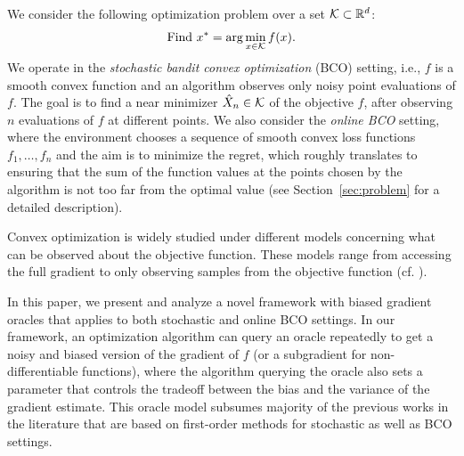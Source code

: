 We consider the following optimization problem over a set $\mathcal{K} \subset \mathbb{R}^d$:
\begin{align}
\mbox{Find } x^* = \arg\min_{x \in \mathcal{K}} f(x). \label{eq:pb}
\end{align}
We operate in the \textit{stochastic bandit convex optimization} (BCO) setting, i.e., $f$ is a smooth convex function and an algorithm observes only noisy point evaluations of $f$. The goal is to find a near minimizer $\hat X_n \in \mathcal{K}$ of the objective $f$, after observing $n$ evaluations of $f$ at different points.
We also consider the \textit{online BCO} setting, where the environment chooses a sequence of smooth convex loss functions $f_1,\dots,f_n$ and the aim is to minimize the regret, which roughly translates to ensuring
 that the sum of the function values at the points chosen by the algorithm is not too far from the optimal value 
 (see Section~\ref{sec:problem} for a detailed description).

Convex optimization is widely studied under different models concerning what can be observed about the objective function. 
These models range from accessing the full gradient to only observing samples from the objective function (cf. \citealp{nesterov2004introductory,DeGliNe14,HaLe14:SOC,PoTsy90,flaxman2005online,AbHaRa08,AgDeXi10,Ne11:TR,AgFoHsuKaRa13:SIAM,katkul,kushcla,spall1992multivariate,spall1997one,Dip03:AoS,bhatnagar-book,duchi2015optimal}). 

In this paper, 
we present and analyze a novel framework with biased gradient oracles that applies to both stochastic and online BCO settings. 
In our framework, an optimization algorithm can query an oracle repeatedly to get a noisy and biased version of the gradient of $f$ (or a subgradient for non-differentiable functions), where the algorithm querying the oracle also sets a parameter that controls the tradeoff between the bias and the variance of the gradient estimate.
This oracle model subsumes majority of the previous works in the literature that are based on first-order methods for stochastic as well as BCO settings.



